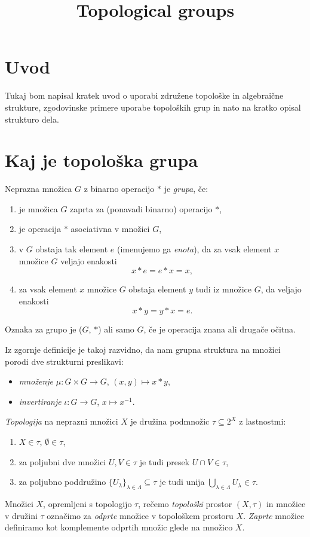 \documentclass[mat1]{fmfdelo}
\title{Topological groups}
\begin{document}
\section{Uvod}
Tukaj bom napisal kratek uvod o uporabi združene topološke in algebraične strukture, zgodovinske primere uporabe topoloških grup in nato na kratko opisal strukturo dela.

\section{Kaj je topološka grupa}

\begin{definicija}\label{def:grupa}
Neprazna množica $G$ z binarno operacijo $*$ je \emph{grupa}, če:
\begin{enumerate}
\item je množica $G$ zaprta za (ponavadi binarno) operacijo $*$,
\item je operacija $*$ asociativna v množici $G$,
\item v $G$ obstaja tak element $e$ (imenujemo ga \emph{enota}), da za vsak element $x$ množice $G$ veljajo enakosti \[ x*e = e*x = x, \]
\item za vsak element $x$ množice $G$ obstaja element $y$ tudi iz množice $G$, da veljajo enakosti \[ x*y = y*x = e. \]
\end{enumerate}
Oznaka za grupo je ($G$, $*$) ali samo $G$, če je operacija znana ali drugače očitna.
\end{definicija}

Iz zgornje definicije je takoj razvidno, da nam grupna struktura na množici porodi dve strukturni preslikavi:
\begin{itemize}
\item \emph{množenje} $\mu: G \times G \to G$, $(x, y) \mapsto x*y$,
\item \emph{invertiranje} $\iota: G \to G$, $x \mapsto x^{-1}$.
\end{itemize}

\begin{definicija}
\emph{Topologija} na neprazni množici $X$ je družina podmnožic $\tau \subseteq 2^X$ z lastnostmi:
\begin{enumerate}\label{def:topologija}
\item $X \in \tau$, $\emptyset \in \tau$,
\item za poljubni dve množici $U,V \in \tau$ je tudi presek $U \cap V \in \tau$,
\item za poljubno poddružino $\lbrace U_{\lambda} \rbrace_{\lambda \in \Lambda} \subseteq \tau$ je tudi unija $\bigcup\limits_{\lambda \in \Lambda}^{} U_{\lambda} \in \tau$.
\end{enumerate}
Množici $X$, opremljeni s topologijo $\tau$, rečemo \emph{topološki} prostor $(X, \tau)$ in množice v družini $\tau$ označimo za \emph{odprte} množice v topološkem prostoru $X$. \emph{Zaprte} množice definiramo kot komplemente odprtih množic glede na množico $X$.
\end{definicija}
\end{document}
